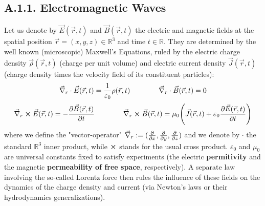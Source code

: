 \documentclass[11pt, a4paper, twoside]{article} %
\newcommand{\R}{\mathbb{R}} %
\begin{document}
\subsection*{A.1.1. Electromagnetic Waves \vspace{-0.2cm}}
Let us denote by $\vec{E}(\vec{r},t)$ and $\vec{B}(\vec{r},t)$ the electric and magnetic fields at the spatial position $\vec{r}=(x,y,z)\in\R^3$ and time $t\in\R$. They are determined by the well known (microscopic) Maxwell's Equations, ruled by the electric charge density $\vec{\rho}(\vec{r},t)$ (charge per unit volume) and electric current density $\vec{J}(\vec{r},t)$ (charge density times the velocity field of its constituent particles):\vspace{-0.2cm}
\begin{equation}\label{div}
\vec{\nabla}_r\cdot \vec{E}(\vec{r},t)=\frac{1}{\varepsilon_0}\rho(\vec{r},t) \quad  \quad \quad \quad \vec{\nabla}_r\cdot \vec{B}(\vec{r},t)=0 \vspace{-0.2cm}
\end{equation}
\begin{equation}\label{curl}
\vec{\nabla }_r\cross \vec{E}(\vec{r},t)=-\pdv{\vec{B}(\vec{r},t)}{t}  \quad  \quad \quad \quad \vec{\nabla }_r\cross \vec{B}(\vec{r},t)=\mu_0\qty(\vec{J}(\vec{r},t)+\varepsilon_0\pdv{\vec{E}(\vec{r},t)}{t})\vspace{-0.2cm}
\end{equation}
where we define the "vector-operator" $\vec{\nabla}_r:=(\pdv{}{x}, \pdv{}{y},\pdv{}{z})$ and we denote by $\cdot$ the standard $\R^3$ inner product, while $\cross $ stands for the usual cross product. $\varepsilon_0$ and $\mu_0$ are universal constants fixed to satisfy experiments (the electric {\bf permitivity} and the magnetic {\bf permeability of free space}, respectively). A separate law involving the so-called Lorentz force then rules the influence of these fields on the dynamics of the charge density and current (via Newton's laws or their hydrodynamics generalizations).
\end{document}
